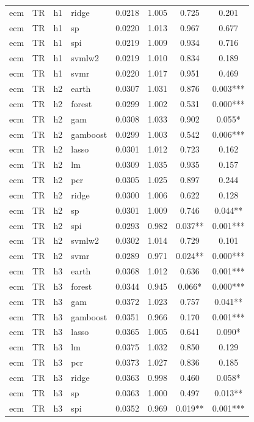 \begin{ThreePartTable}
\begin{longtable}[t]{llclcccc}
ecm & TR & h1 & ridge & 0.0218 & 1.005 & 0.725 & 0.201\\
ecm & TR & h1 & sp & 0.0220 & 1.013 & 0.967 & 0.677\\
ecm & TR & h1 & spi & 0.0219 & 1.009 & 0.934 & 0.716\\
ecm & TR & h1 & svmlw2 & 0.0219 & 1.010 & 0.834 & 0.189\\
ecm & TR & h1 & svmr & 0.0220 & 1.017 & 0.951 & 0.469\\
\addlinespace
ecm & TR & h2 & earth & 0.0307 & 1.031 & 0.876 & 0.003***\\
ecm & TR & h2 & forest & 0.0299 & 1.002 & 0.531 & 0.000***\\
ecm & TR & h2 & gam & 0.0308 & 1.033 & 0.902 & 0.055*\\
ecm & TR & h2 & gamboost & 0.0299 & 1.003 & 0.542 & 0.006***\\
ecm & TR & h2 & lasso & 0.0301 & 1.012 & 0.723 & 0.162\\
ecm & TR & h2 & lm & 0.0309 & 1.035 & 0.935 & 0.157\\
ecm & TR & h2 & pcr & 0.0305 & 1.025 & 0.897 & 0.244\\
ecm & TR & h2 & ridge & 0.0300 & 1.006 & 0.622 & 0.128\\
ecm & TR & h2 & sp & 0.0301 & 1.009 & 0.746 & 0.044**\\
ecm & TR & h2 & spi & 0.0293 & 0.982 & 0.037** & 0.001***\\
ecm & TR & h2 & svmlw2 & 0.0302 & 1.014 & 0.729 & 0.101\\
ecm & TR & h2 & svmr & 0.0289 & 0.971 & 0.024** & 0.000***\\
\addlinespace
ecm & TR & h3 & earth & 0.0368 & 1.012 & 0.636 & 0.001***\\
ecm & TR & h3 & forest & 0.0344 & 0.945 & 0.066* & 0.000***\\
ecm & TR & h3 & gam & 0.0372 & 1.023 & 0.757 & 0.041**\\
ecm & TR & h3 & gamboost & 0.0351 & 0.966 & 0.170 & 0.001***\\
ecm & TR & h3 & lasso & 0.0365 & 1.005 & 0.641 & 0.090*\\
ecm & TR & h3 & lm & 0.0375 & 1.032 & 0.850 & 0.129\\
ecm & TR & h3 & pcr & 0.0373 & 1.027 & 0.836 & 0.185\\
ecm & TR & h3 & ridge & 0.0363 & 0.998 & 0.460 & 0.058*\\
ecm & TR & h3 & sp & 0.0363 & 1.000 & 0.497 & 0.013**\\
ecm & TR & h3 & spi & 0.0352 & 0.969 & 0.019** & 0.001***\\

\end{longtable}
\end{ThreePartTable}
